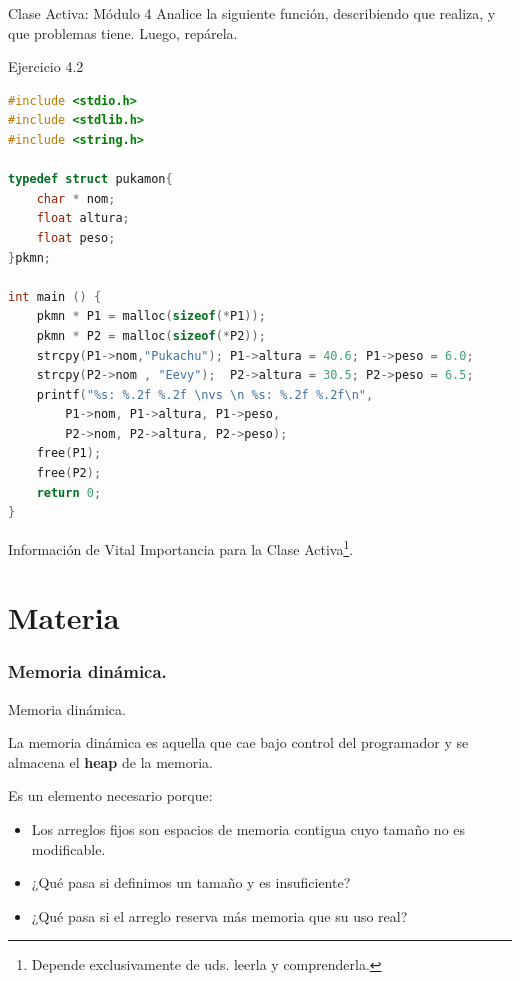 \documentclass{beamer}
\begin{document}
\begin{frame}[fragile]{Clase Activa: Módulo 4}
Analice la siguiente función, describiendo que realiza, y que problemas tiene. Luego, repárela.
\begin{exampleblock}{Ejercicio 4.2}
\begin{lstlisting}[language=C, basicstyle=\tiny]
#include <stdio.h>
#include <stdlib.h>
#include <string.h>

typedef struct pukamon{
	char * nom;
	float altura;
	float peso;
}pkmn;

int main () {
	pkmn * P1 = malloc(sizeof(*P1));
	pkmn * P2 = malloc(sizeof(*P2));
	strcpy(P1->nom,"Pukachu"); P1->altura = 40.6; P1->peso = 6.0;
	strcpy(P2->nom , "Eevy");  P2->altura = 30.5; P2->peso = 6.5;
	printf("%s: %.2f %.2f \nvs \n %s: %.2f %.2f\n",
		P1->nom, P1->altura, P1->peso,
		P2->nom, P2->altura, P2->peso);
	free(P1);
	free(P2);
	return 0;
}
\end{lstlisting}
\end{exampleblock}

\end{frame}



\begin{frame}
\centering \Huge Información de Vital Importancia para la Clase Activa\footnote{Depende exclusivamente de uds. leerla y comprenderla.}.
\end{frame}


\part{Materia}
\section{Memoria dinámica.}
\begin{frame}[fragile]{Memoria dinámica.}

La memoria dinámica es aquella que cae bajo control del programador y se almacena el \textbf{heap} de la memoria. 

Es un elemento necesario porque:
\begin{itemize}
\item Los arreglos fijos son espacios de memoria contigua cuyo tamaño no es modificable.
\item ¿Qué pasa si definimos un tamaño y es insuficiente?
\item ¿Qué pasa si el arreglo reserva más memoria que su uso real?
\end{itemize}
\end{frame}
\end{document}

